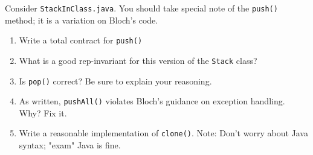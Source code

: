 Consider {\tt StackInClass.java}.
You should take special note of the {\tt push()} method;
it is a variation on Bloch's code.

\begin{enumerate}
\item
Write a total contract for {\tt push() }

\item
What is a good rep-invariant for this version of the {\tt Stack} class?

\item
Is {\tt pop()} correct?  Be sure to explain your reasoning.

\item
As written, {\tt pushAll()} violates Bloch's guidance on exception handling.  Why?  Fix it.

\item
Write a reasonable implementation of {\tt clone()}.  
Note: Don't worry about Java syntax; "exam" Java is fine.
\end{enumerate}
